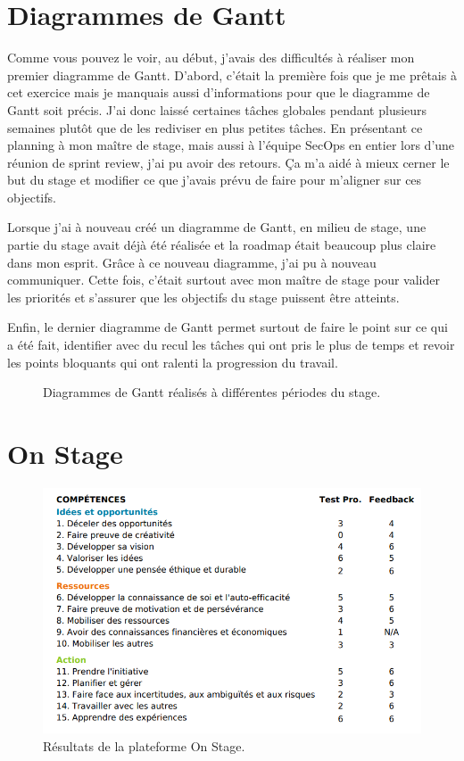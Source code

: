 \section{Diagrammes de Gantt}

Comme vous pouvez le voir, au début, j'avais des difficultés à réaliser mon premier diagramme de Gantt. D'abord, c'était la première fois que je me prêtais à cet exercice mais je manquais aussi d'informations pour que le diagramme de Gantt soit précis. J'ai donc laissé certaines tâches globales pendant plusieurs semaines plutôt que de les rediviser en plus petites tâches. En présentant ce planning à mon maître de stage, mais aussi à l'équipe SecOps en entier lors d'une réunion de sprint review, j'ai pu avoir des retours. Ça m'a aidé à mieux cerner le but du stage et modifier ce que j'avais prévu de faire pour m'aligner sur ces objectifs.

Lorsque j'ai à nouveau créé un diagramme de Gantt, en milieu de stage, une partie du stage avait déjà été réalisée et la roadmap était beaucoup plus claire dans mon esprit. Grâce à ce nouveau diagramme, j'ai pu à nouveau communiquer. Cette fois, c'était surtout avec mon maître de stage pour valider les priorités et s'assurer que les objectifs du stage puissent être atteints.

Enfin, le dernier diagramme de Gantt permet surtout de faire le point sur ce qui a été fait, identifier avec du recul les tâches qui ont pris le plus de temps et revoir les points bloquants qui ont ralenti la progression du travail.

\begin{figure}
    \centering
    \noindent
    \makebox[\textwidth]{
        \resizebox{19cm}{!}{
            
        }
    }
    \caption{Diagrammes de Gantt réalisés à différentes périodes du stage.}
    \label{fig:gantt-diagrams}
\end{figure}





\section{On Stage}

\begin{figure}
    \centering
    \includegraphics[width=0.85\linewidth]{images/onstage/onstage-skills.png}
    \caption{Résultats de la plateforme On Stage.}
    \label{fig:onstage}
\end{figure}

